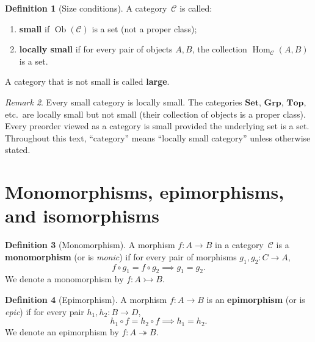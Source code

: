 \documentclass[a4paper,12pt]{book}
\DeclareMathOperator{\Hom}{Hom}
\DeclareMathOperator{\Ob}{Ob}
\newcommand{\Set}{\mathbf{Set}}
\newcommand{\Grp}{\mathbf{Grp}}
\newcommand{\Top}{\mathbf{Top}}
\theoremstyle{definition}
\newtheorem{definition}{Definition}[section]
\theoremstyle{plain}
\theoremstyle{remark}
\newtheorem{remark}[definition]{Remark}
\begin{document}
\begin{definition}[Size conditions]\label{def:size}
A category~$\mathcal{C}$ is called:
\begin{enumerate}[label=(\roman*)]
    \item \textbf{small} if $\Ob(\mathcal{C})$ is a set
          (not a proper class);
    \item \textbf{locally small} if for every pair of objects
          $A,B$, the collection $\Hom_\mathcal{C}(A,B)$ is a set.
\end{enumerate}
A category that is not small is called \textbf{large}.
\end{definition}

\begin{remark}\label{rem:size-remarks}
Every small category is locally small.
The categories $\Set$, $\Grp$, $\Top$, etc.\ are locally small but not
small (their collection of objects is a proper class).
Every preorder viewed as a category is small provided the underlying
set is a set.
Throughout this text, ``category'' means ``locally small category''
unless otherwise stated.
\end{remark}


\section{Monomorphisms, epimorphisms, and isomorphisms}
\label{sec:mono-epi-iso}

\begin{definition}[Monomorphism]\label{def:mono}
A morphism $f\colon A\to B$ in a category~$\mathcal{C}$ is a
\textbf{monomorphism} (or is \emph{monic}) if for every pair of
morphisms $g_1,g_2\colon C\to A$,
\[
    f\circ g_1 = f\circ g_2 \implies g_1 = g_2.
\]
We denote a monomorphism by $f\colon A\rightarrowtail B$.
\end{definition}

\begin{definition}[Epimorphism]\label{def:epi}
A morphism $f\colon A\to B$ is an \textbf{epimorphism} (or is
\emph{epic}) if for every pair $h_1,h_2\colon B\to D$,
\[
    h_1\circ f = h_2\circ f \implies h_1 = h_2.
\]
We denote an epimorphism by $f\colon A\twoheadrightarrow B$.
\end{definition}
\end{document}

